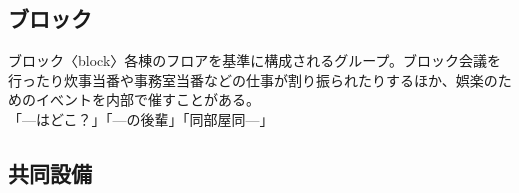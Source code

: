     \subsection{ブロック}
    \noindent ブロック〈block〉各棟のフロアを基準に構成されるグループ。ブロック会議を行ったり炊事当番や事務室当番などの仕事が割り振られたりするほか、娯楽のためのイべントを内部で催すことがある。\\
    「—はどこ？」「—の後輩」「同部屋同—」

		\subsection{共同設備}

    \renewcommand{\arraystretch}{1.2}
    \vspace{-8mm}
    \begin{table}[htbp]
      \begin{tabular}{lp{}}
        

\end{tabular}
\end{table}
